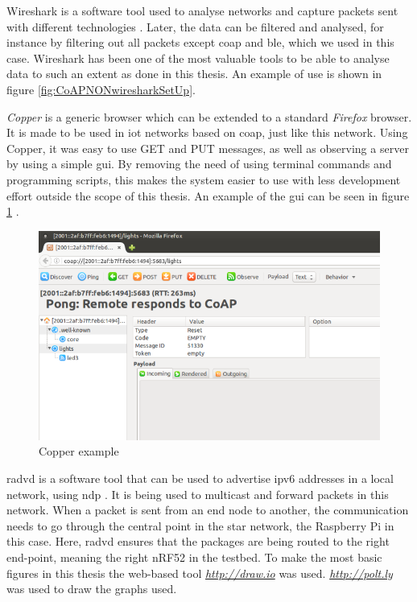 \noindent Wireshark is a software tool used to analyse networks and capture packets sent with different technologies \cite{lamping2004wireshark}. Later, the data can be filtered and analysed, for instance by filtering out all packets except \gls{coap} and \gls{ble}, which we used in this case. Wireshark has been one of the most valuable tools to be able to analyse data to such an extent as done in this thesis. An example of use is shown in figure \ref{fig:CoAPNONwiresharkSetUp}. 

\noindent \textit{Copper}\cite{copper3} is a generic browser which can be extended to a standard \textit{Firefox} browser. It is made to be used in \gls{iot} networks based on \gls{coap}, just like this network. Using Copper, it was easy to use GET and PUT messages, as well as observing a server by using a simple \gls{gui}. By removing the need of using terminal commands and programming scripts, this makes the system easier to use with less development effort outside the scope of this thesis. An example of the \gls{gui} can be seen in figure \ref{fig:copperExample} 
\cite{kovatsch2011demo}.

\begin{figure}[ht]
    \centering
    \includegraphics[width=1.0\textwidth]{CopperExample.png}    
    \caption{Copper example}
    \label{fig:copperExample}
\end{figure}

\newpage

\noindent \gls{radvd} is a software tool that can be used to advertise \gls{ipv6} addresses in a local network, using \gls{ndp} \cite{chown2011rogue}. It is being used to multicast and forward packets in this network. When a packet is sent from an end node to another, the communication needs to go through the central point in the star network, the Raspberry Pi in this case. Here, \gls{radvd} ensures that the packages are being routed to the right end-point, meaning the right nRF52 in the testbed. To make the most basic figures in this thesis the web-based tool \textit{\url{http://draw.io}} was used. \textit{\url{http://polt.ly}} was used to draw the graphs used.  


